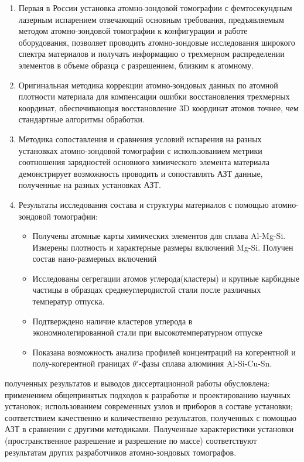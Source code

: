 \clearpage
{}
\begin{enumerate}[beginpenalty=10000] %
  \item Первая в России установка атомно-зондовой томографии с фемтосекундным лазерным испарением отвечающий основным требования, предъявляемым методом атомно-зондовой томографии к конфигурации и работе оборудования, позволяет проводить атомно-зондовые исследования широкого спектра материалов  и получать информацию о трехмерном распределении элементов в объеме образца с разрешением, близким к атомному.
  \item Оригинальная методика коррекции атомно-зондовых данных по атомной плотности материала для компенсации ошибки восстановления трехмерных координат, обеспечивающая восстановление 3D координат атомов точнее, чем стандартные алгоритмы обработки.     
  \item Методика сопоставления и сравнения условий испарения на разных установках атомно-зондовой томографии с использованием метрики соотношения зарядностей основного химического элемента материала демонстрирует возможность проводить и сопоставлять АЗТ данные, полученные на разных установках АЗТ.
  \item Результаты исследования состава и структуры материалов с помощью атомно-зондовой томографии:
  \begin{itemize}
  	\item Получены атомные карты химических элементов для сплава Al-Mg-Si. Измерены плотность и характерные размеры включений Mg-Si. Получен состав нано-размерных включений
  	\item Исследованы сегрегации атомов углерода(кластеры) и крупные карбидные частицы в образцах среднеуглеродистой стали после различных температур отпуска.
  	\item Подтверждено наличие кластеров углерода в \\ экономнолегированной стали при высокотемпературном отпуске
  	\item Показана возможность анализа профилей концентраций на когерентной и полу-когерентной границах $\theta '$-фазы сплава алюминия Al-Si-Cu-Sn.
  \end{itemize}
  
  
\end{enumerate}

{\reliability} полученных результатов и выводов диссертационной работы обусловлена: применением общепринятых подходов к разработке и проектированию научных установок; использованием современных узлов и приборов в составе установки; соответствием качественно и количественно результатов, полученных с помощью АЗТ в сравнении с другими методиками. Полученные характеристики установки (пространственное разрешение и разрешение по массе) соответствуют результатам других разработчиков атомно-зондовых томографов.


